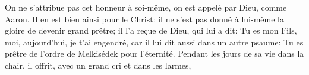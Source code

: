 On ne s’attribue pas cet honneur à soi-même,
	on est appelé par Dieu, comme Aaron.
Il en est bien ainsi pour le Christ:
	il ne s’est pas donné à lui-même la gloire de devenir grand prêtre;
	il l’a reçue de Dieu, qui lui a dit:
	Tu es mon Fils, moi, aujourd’hui, je t’ai engendré,
	car il lui dit aussi dans un autre psaume:
	Tu es prêtre de l’ordre de Melkisédek pour l’éternité.
Pendant les jours de sa vie dans la chair,
	il offrit, avec un grand cri et dans les larmes,\hfill{}
